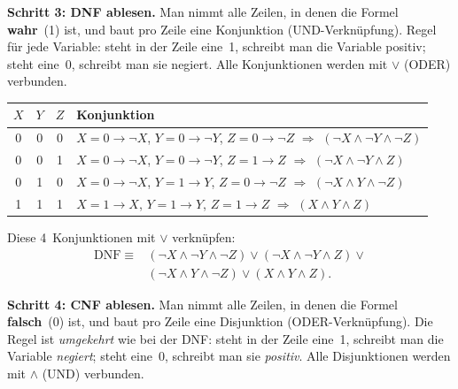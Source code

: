 \documentclass[a4paper,12pt]{article}
\begin{document}
\medskip
\textbf{Schritt 3: DNF ablesen.}
Man nimmt alle Zeilen, in denen die Formel \textbf{wahr}~(1) ist,
und baut pro Zeile eine Konjunktion (UND-Verkn\"upfung).
Regel f\"ur jede Variable: steht in der Zeile eine~1, schreibt man
die Variable positiv; steht eine~0, schreibt man sie negiert.
Alle Konjunktionen werden mit $\vee$ (ODER) verbunden.

\begin{center}
\renewcommand{\arraystretch}{1.25}
\begin{tabular}{ccc|l}
\toprule
$X$ & $Y$ & $Z$ & Konjunktion \\
\midrule
0 & 0 & 0
  & $X\!=\!0 \to \neg X$,\; $Y\!=\!0 \to \neg Y$,\;
    $Z\!=\!0 \to \neg Z$
    \;$\Rightarrow$\; $(\neg X \wedge \neg Y \wedge \neg Z)$ \\
0 & 0 & 1
  & $X\!=\!0 \to \neg X$,\; $Y\!=\!0 \to \neg Y$,\;
    $Z\!=\!1 \to Z$
    \;$\Rightarrow$\; $(\neg X \wedge \neg Y \wedge Z)$ \\
0 & 1 & 0
  & $X\!=\!0 \to \neg X$,\; $Y\!=\!1 \to Y$,\;
    $Z\!=\!0 \to \neg Z$
    \;$\Rightarrow$\; $(\neg X \wedge Y \wedge \neg Z)$ \\
1 & 1 & 1
  & $X\!=\!1 \to X$,\; $Y\!=\!1 \to Y$,\;
    $Z\!=\!1 \to Z$
    \;$\Rightarrow$\; $(X \wedge Y \wedge Z)$ \\
\bottomrule
\end{tabular}
\end{center}

Diese 4~Konjunktionen mit $\vee$ verkn\"upfen:
\begin{align*}
\text{DNF} \;\equiv\; &(\neg X \wedge \neg Y \wedge \neg Z) \vee
(\neg X \wedge \neg Y \wedge Z) \vee {} \\
& (\neg X \wedge Y \wedge \neg Z) \vee
(X \wedge Y \wedge Z).
\end{align*}

\textbf{Schritt 4: CNF ablesen.}
Man nimmt alle Zeilen, in denen die Formel \textbf{falsch}~(0) ist,
und baut pro Zeile eine Disjunktion (ODER-Verkn\"upfung).
Die Regel ist \emph{umgekehrt} wie bei der DNF: steht in der Zeile
eine~1, schreibt man die Variable \emph{negiert}; steht eine~0,
schreibt man sie \emph{positiv}. Alle Disjunktionen werden mit
$\wedge$ (UND) verbunden.
\end{document}
